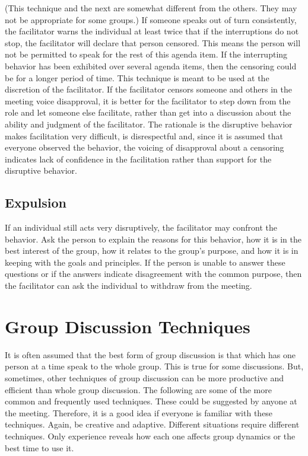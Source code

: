 (This technique and the next are somewhat different from the
others. They may not be appropriate for some groups.) If someone
speaks out of turn consistently, the facilitator warns the
individual at least twice that if the interruptions do not stop,
the facilitator will declare that person censored. This means the
person will not be permitted to speak for the rest of this agenda
item. If the interrupting behavior has been exhibited over several
agenda items, then the censoring could be for a longer period of
time. This technique is meant to be used at the discretion of the
facilitator.  If the facilitator censors someone and others in the
meeting voice disapproval, it is better for the facilitator to step
down from the role and let someone else facilitate, rather than get
into a discussion about the ability and judgment of the
facilitator. The rationale is the disruptive behavior makes
facilitation very difficult, is disrespectful and, since it is
assumed that everyone observed the behavior, the voicing of
disapproval about a censoring indicates lack of confidence in the
facilitation rather than support for the disruptive behavior.

\subsection{Expulsion}

If an individual still acts very disruptively, the facilitator may
confront the behavior. Ask the person to explain the reasons for
this behavior, how it is in the best interest of the group, how it
relates to the group's purpose, and how it is in keeping with the
goals and principles. If the person is unable to answer these
questions or if the answers indicate disagreement with the common
purpose, then the facilitator can ask the individual to withdraw
from the meeting.

\section{Group Discussion Techniques}

It is often assumed that the best form of group discussion is that
which has one person at a time speak to the whole group. This is
true for some discussions. But, sometimes, other techniques of
group discussion can be more productive and efficient than whole
group discussion. The following are some of the more common and
frequently used techniques. These could be suggested by anyone at
the meeting. Therefore, it is a good idea if everyone is familiar
with these techniques. Again, be creative and adaptive.  Different
situations require different techniques. Only experience
reveals how each one affects group dynamics or the best time to use
it.

